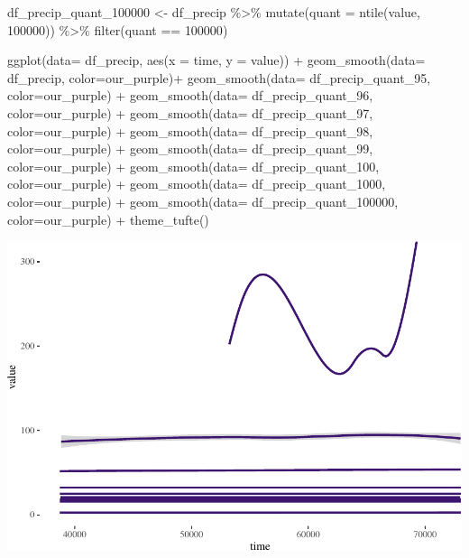 \documentclass[
  paper=a4,
  ,captions=tableheading
]{scrartcl}
\newenvironment{Shaded}{\begin{snugshade}}{\end{snugshade}}
\newcommand{\AttributeTok}[1]{\textcolor[rgb]{0.77,0.63,0.00}{#1}}
\newcommand{\DecValTok}[1]{\textcolor[rgb]{0.00,0.00,0.81}{#1}}
\newcommand{\FunctionTok}[1]{\textcolor[rgb]{0.00,0.00,0.00}{#1}}
\newcommand{\NormalTok}[1]{#1}
\newcommand{\OtherTok}[1]{\textcolor[rgb]{0.56,0.35,0.01}{#1}}
\newcommand{\SpecialCharTok}[1]{\textcolor[rgb]{0.00,0.00,0.00}{#1}}
\begin{document}
\begin{Shaded}
\begin{Highlighting}[]
\NormalTok{df\_precip\_quant\_100000 }\OtherTok{\textless{}{-}}\NormalTok{ df\_precip }\SpecialCharTok{\%\textgreater{}\%} 
  \FunctionTok{mutate}\NormalTok{(}\AttributeTok{quant =} \FunctionTok{ntile}\NormalTok{(value, }\DecValTok{100000}\NormalTok{)) }\SpecialCharTok{\%\textgreater{}\%}
  \FunctionTok{filter}\NormalTok{(quant }\SpecialCharTok{==} \DecValTok{100000}\NormalTok{)}
\end{Highlighting}
\end{Shaded}

\begin{Shaded}
\begin{Highlighting}[]
\FunctionTok{ggplot}\NormalTok{(}\AttributeTok{data=}\NormalTok{ df\_precip, }\FunctionTok{aes}\NormalTok{(}\AttributeTok{x =}\NormalTok{ time, }\AttributeTok{y =}\NormalTok{ value)) }\SpecialCharTok{+} 
     \FunctionTok{geom\_smooth}\NormalTok{(}\AttributeTok{data=}\NormalTok{ df\_precip, }\AttributeTok{color=}\NormalTok{our\_purple)}\SpecialCharTok{+} 
     \FunctionTok{geom\_smooth}\NormalTok{(}\AttributeTok{data=}\NormalTok{ df\_precip\_quant\_95, }\AttributeTok{color=}\NormalTok{our\_purple) }\SpecialCharTok{+}
    \FunctionTok{geom\_smooth}\NormalTok{(}\AttributeTok{data=}\NormalTok{ df\_precip\_quant\_96, }\AttributeTok{color=}\NormalTok{our\_purple) }\SpecialCharTok{+}
    \FunctionTok{geom\_smooth}\NormalTok{(}\AttributeTok{data=}\NormalTok{ df\_precip\_quant\_97, }\AttributeTok{color=}\NormalTok{our\_purple) }\SpecialCharTok{+}
    \FunctionTok{geom\_smooth}\NormalTok{(}\AttributeTok{data=}\NormalTok{ df\_precip\_quant\_98, }\AttributeTok{color=}\NormalTok{our\_purple) }\SpecialCharTok{+}
    \FunctionTok{geom\_smooth}\NormalTok{(}\AttributeTok{data=}\NormalTok{ df\_precip\_quant\_99, }\AttributeTok{color=}\NormalTok{our\_purple) }\SpecialCharTok{+}
  \FunctionTok{geom\_smooth}\NormalTok{(}\AttributeTok{data=}\NormalTok{ df\_precip\_quant\_100, }\AttributeTok{color=}\NormalTok{our\_purple) }\SpecialCharTok{+}
  \FunctionTok{geom\_smooth}\NormalTok{(}\AttributeTok{data=}\NormalTok{ df\_precip\_quant\_1000, }\AttributeTok{color=}\NormalTok{our\_purple) }\SpecialCharTok{+}
    \FunctionTok{geom\_smooth}\NormalTok{(}\AttributeTok{data=}\NormalTok{ df\_precip\_quant\_100000, }\AttributeTok{color=}\NormalTok{our\_purple) }\SpecialCharTok{+}
  \FunctionTok{theme\_tufte}\NormalTok{()}
\end{Highlighting}
\end{Shaded}

\includegraphics{Haskell_files/figure-latex/unnamed-chunk-56-1.pdf}
\end{document}
